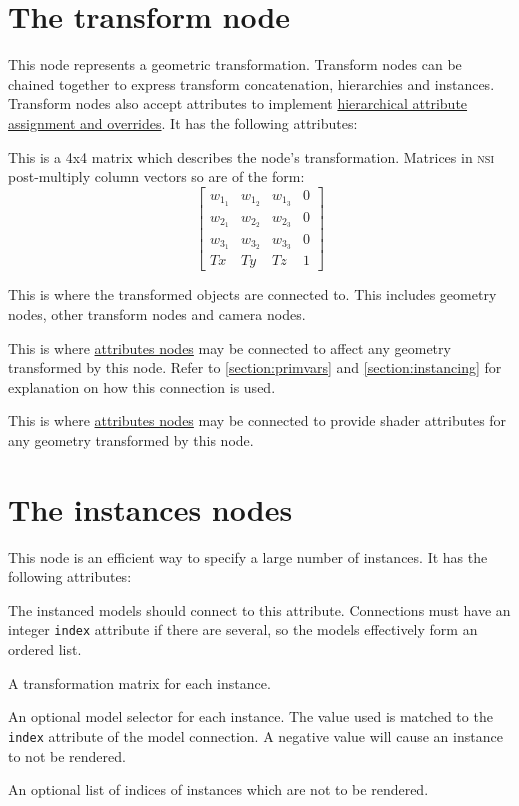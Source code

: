 \documentclass[oneside,ebook]{memoir}
\newcommand*{\acronym}[1]{\textsc{\lowercase{#1}}}
\newcommand{\paramlistitemTN}[2]{\item[#2\textcolor{lightgray}{\dotfill}#1]}
\newcommand{\paramlistitemTND}[3]{\paramlistitemTN{#1 {\rmfamily({\ttfamily#3})}}{#2}}
\begin{document}
\section{The transform node}
\label{section:transformnode}
This node represents a geometric transformation. Transform nodes can be chained together to express transform concatenation, hierarchies and instances.  Transform nodes also accept attributes to implement \hyperref[section:primvars]{hierarchical attribute assignment and overrides}. It has the following attributes:
\begin{paramlist}
\paramlistitemTN{doublematrix}{transformationmatrix}
This is a 4x4 matrix which describes the node's transformation. Matrices in \acronym{NSI} post-multiply column vectors so are of the form:
\[ \left[ \begin{array}{cccc}
      w_{1_1} & w_{1_2} & w_{1_3} & 0  \\
      w_{2_1} & w_{2_2} & w_{2_3} & 0  \\
      w_{3_1} & w_{3_2} & w_{3_3} & 0  \\
	  Tx & Ty & Tz & 1 \end{array} \right] \]
\paramlistitemTN{<connection>}{objects}
This is where the transformed objects are connected to. This includes geometry nodes, other transform nodes and camera nodes.
\paramlistitemTN{<connection>}{geometryattributes}
This is where \hyperref[section:attributesnode]{attributes nodes} may be connected to affect any geometry transformed by this node. Refer to \autoref{section:primvars} and \autoref{section:instancing} for explanation on how this connection is used.
\paramlistitemTN{<connection>}{shaderattributes}
This is where \hyperref[section:attributesnode]{attributes nodes} may be connected to provide shader attributes for any geometry transformed by this node.
\end{paramlist}

\section{The instances nodes}
\label{section:instancesnode}
This node is an efficient way to specify a large number of instances. It has the following attributes:
\begin{paramlist}
\paramlistitemTN{<connection>}{sourcemodels}
The instanced models should connect to this attribute. Connections must have an integer \lstinline|index| attribute if there are several, so the models effectively form an ordered list.
\paramlistitemTN{doublematrix}{transformationmatrices}
A transformation matrix for each instance.
\paramlistitemTND{int}{modelindices}{0}
An optional model selector for each instance. The value used is matched to the \lstinline|index| attribute of the model connection. A negative value will cause an instance to not be rendered.
\paramlistitemTN{int}{disabledinstances}
An optional list of indices of instances which are not to be rendered.
\end{paramlist}
\end{document}
